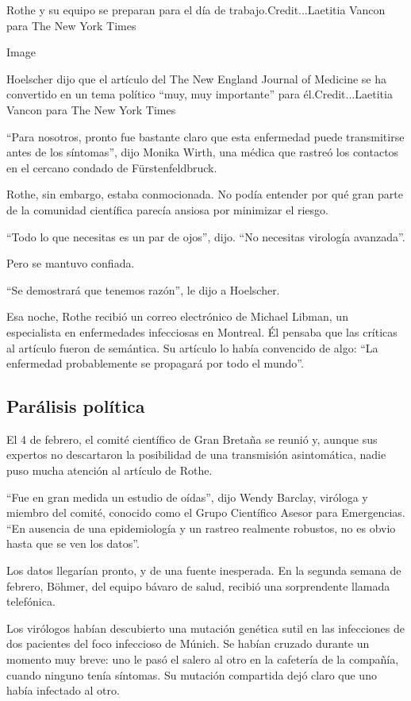 Rothe y su equipo se preparan para el día de trabajo.Credit...Laetitia
Vancon para The New York Times

Image

Hoelscher dijo que el artículo del The New England Journal of Medicine
se ha convertido en un tema político ``muy, muy importante'' para
él.Credit...Laetitia Vancon para The New York Times

``Para nosotros, pronto fue bastante claro que esta enfermedad puede
transmitirse antes de los síntomas'', dijo Monika Wirth, una médica que
rastreó los contactos en el cercano condado de Fürstenfeldbruck.

Rothe, sin embargo, estaba conmocionada. No podía entender por qué gran
parte de la comunidad científica parecía ansiosa por minimizar el
riesgo.

``Todo lo que necesitas es un par de ojos'', dijo. ``No necesitas
virología avanzada''.

Pero se mantuvo confiada.

``Se demostrará que tenemos razón'', le dijo a Hoelscher.

Esa noche, Rothe recibió un correo electrónico de Michael Libman, un
especialista en enfermedades infecciosas en Montreal. Él pensaba que las
críticas al artículo fueron de semántica. Su artículo lo había
convencido de algo: ``La enfermedad probablemente se propagará por todo
el mundo''.

\hypertarget{paruxe1lisis-poluxedtica}{%
\subsection{Parálisis política}\label{paruxe1lisis-poluxedtica}}

El 4 de febrero, el comité científico de Gran Bretaña se reunió y,
aunque sus expertos no descartaron la posibilidad de una transmisión
asintomática, nadie puso mucha atención al artículo de Rothe.

``Fue en gran medida un estudio de oídas'', dijo Wendy Barclay, viróloga
y miembro del comité, conocido como el Grupo Científico Asesor para
Emergencias. ``En ausencia de una epidemiología y un rastreo realmente
robustos, no es obvio hasta que se ven los datos''.

Los datos llegarían pronto, y de una fuente inesperada. En la segunda
semana de febrero, Böhmer, del equipo bávaro de salud, recibió una
sorprendente llamada telefónica.

Los virólogos habían descubierto una mutación genética sutil en las
infecciones de dos pacientes del foco infeccioso de Múnich. Se habían
cruzado durante un momento muy breve: uno le pasó el salero al otro en
la cafetería de la compañía, cuando ninguno tenía síntomas. Su mutación
compartida dejó claro que uno había infectado al otro.

